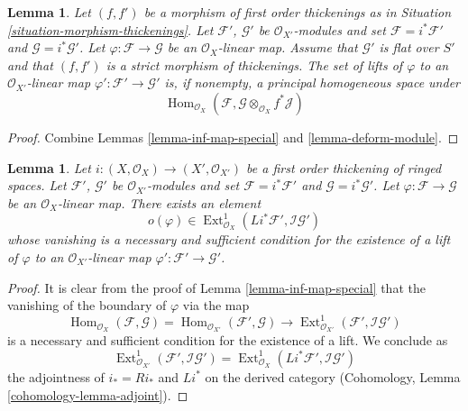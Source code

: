 \documentclass{stacks-project}
\theoremstyle{plain}
\newtheorem{lemma}[subsection]{Lemma}
\theoremstyle{definition}
\theoremstyle{remark}
\numberwithin{equation}{subsection}
\def\Hom{\mathop{\mathrm{Hom}}\nolimits}
\def\Ext{\mathop{\mathrm{Ext}}\nolimits}
\begin{document}
\begin{lemma}
\label{lemma-inf-map-rel}
Let $(f, f')$ be a morphism of first order thickenings as in
Situation \ref{situation-morphism-thickenings}.
Let $\mathcal{F}'$, $\mathcal{G}'$ be $\mathcal{O}_{X'}$-modules and set
$\mathcal{F} = i^*\mathcal{F}'$ and $\mathcal{G} = i^*\mathcal{G}'$.
Let $\varphi : \mathcal{F} \to \mathcal{G}$ be an $\mathcal{O}_X$-linear map.
Assume that $\mathcal{G}'$ is flat over $S'$ and that
$(f, f')$ is a strict morphism of thickenings.
The set of lifts of $\varphi$ to an $\mathcal{O}_{X'}$-linear map
$\varphi' : \mathcal{F}' \to \mathcal{G}'$ is, if nonempty, a principal
homogeneous space under
$$
\Hom_{\mathcal{O}_X}(\mathcal{F},
\mathcal{G} \otimes_{\mathcal{O}_X} f^*\mathcal{J})
$$
\end{lemma}

\begin{proof}
Combine Lemmas \ref{lemma-inf-map-special} and \ref{lemma-deform-module}.
\end{proof}

\begin{lemma}
\label{lemma-inf-obs-map-special}
Let $i : (X, \mathcal{O}_X) \to (X', \mathcal{O}_{X'})$
be a first order thickening of ringed spaces.
Let $\mathcal{F}'$, $\mathcal{G}'$ be $\mathcal{O}_{X'}$-modules and set
$\mathcal{F} = i^*\mathcal{F}'$ and $\mathcal{G} = i^*\mathcal{G}'$.
Let $\varphi : \mathcal{F} \to \mathcal{G}$ be an $\mathcal{O}_X$-linear map.
There exists an element
$$
o(\varphi) \in
\Ext^1_{\mathcal{O}_X}(Li^*\mathcal{F}',
\mathcal{I}\mathcal{G}')
$$
whose vanishing is a necessary and sufficient condition for the
existence of a lift of $\varphi$ to an $\mathcal{O}_{X'}$-linear map
$\varphi' : \mathcal{F}' \to \mathcal{G}'$.
\end{lemma}

\begin{proof}
It is clear from the proof of Lemma \ref{lemma-inf-map-special} that the
vanishing of the boundary of $\varphi$ via the map
$$
\Hom_{\mathcal{O}_X}(\mathcal{F}, \mathcal{G}) =
\Hom_{\mathcal{O}_{X'}}(\mathcal{F}', \mathcal{G}) \longrightarrow
\Ext^1_{\mathcal{O}_{X'}}(\mathcal{F}', \mathcal{I}\mathcal{G}')
$$
is a necessary and sufficient condition for the existence of a lift. We
conclude as
$$
\Ext^1_{\mathcal{O}_{X'}}(\mathcal{F}', \mathcal{I}\mathcal{G}') =
\Ext^1_{\mathcal{O}_X}(Li^*\mathcal{F}', \mathcal{I}\mathcal{G}')
$$
the adjointness of $i_* = Ri_*$ and $Li^*$ on the derived category
(Cohomology, Lemma \ref{cohomology-lemma-adjoint}).
\end{proof}
\end{document}
